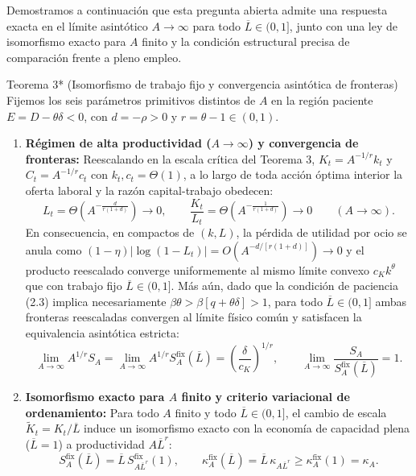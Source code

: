 \documentclass[11pt,letterpaper]{article}
\theoremstyle{plain}
\newtheorem*{namedthm}{\protect\namedthmname}
\newcommand{\namedthmname}{}
\newenvironment{thm_box}[1]{\renewcommand{\namedthmname}{#1}\begin{namedthm}}{\end{namedthm}}
\begin{document}
Demostramos a continuación que esta pregunta abierta admite una respuesta exacta en el límite asintótico $A\to\infty$ para todo $\overline{L}\in(0,1]$, junto con una ley de isomorfismo exacto para $A$ finito y la condición estructural precisa de comparación frente a pleno empleo.

\begin{thm_box}{Teorema 3* (Isomorfismo de trabajo fijo y convergencia asintótica de fronteras)}
Fijemos los seis parámetros primitivos distintos de $A$ en la región paciente $E=D-\theta\delta<0$, con $d=-\rho>0$ y $r=\theta-1\in(0,1)$.
\begin{enumerate}
\item \textbf{Régimen de alta productividad ($A\to\infty$) y convergencia de fronteras:} Reescalando en la escala crítica del Teorema 3, $K_t = A^{-1/r}k_t$ y $C_t = A^{-1/r}c_t$ con $k_t,c_t=\Theta(1)$, a lo largo de toda acción óptima interior la oferta laboral y la razón capital-trabajo obedecen:
\[
L_t = \Theta\!\left(A^{-\frac{d}{r(1+d)}}\right) \to 0, \qquad \frac{K_t}{L_t} = \Theta\!\left(A^{-\frac{1}{r(1+d)}}\right) \to 0 \qquad (A\to\infty).
\]
En consecuencia, en compactos de $(k,L)$, la pérdida de utilidad por ocio se anula como $(1-\eta)|\log(1-L_t)| = O(A^{-d/[r(1+d)]})\to 0$ y el producto reescalado converge uniformemente al mismo límite convexo $c_K k^\theta$ que con trabajo fijo $\overline{L}\in(0,1]$. Más aún, dado que la condición de paciencia (2.3) implica necesariamente $\beta\theta > \beta[q+\theta\delta] > 1$, para todo $\overline{L}\in(0,1]$ ambas fronteras reescaladas convergen al límite físico común y satisfacen la equivalencia asintótica estricta:
\[
\lim_{A\to\infty} A^{1/r} S_A = \lim_{A\to\infty} A^{1/r} S_A^{\mathrm{fix}}(\overline{L}) = \left(\frac{\delta}{c_K}\right)^{1/r}, \qquad \lim_{A\to\infty} \frac{S_A}{S_A^{\mathrm{fix}}(\overline{L})} = 1.
\]
\item \textbf{Isomorfismo exacto para $A$ finito y criterio variacional de ordenamiento:} Para todo $A$ finito y todo $\overline{L}\in(0,1]$, el cambio de escala $\tilde{K}_t=K_t/\overline{L}$ induce un isomorfismo exacto con la economía de capacidad plena ($\overline{L}=1$) a productividad $A\overline{L}^r$:
\[
S_A^{\mathrm{fix}}(\overline{L}) = \overline{L}\,S_{A\overline{L}^r}^{\mathrm{fix}}(1), \qquad \kappa_A^{\mathrm{fix}}(\overline{L}) = \overline{L}\,\kappa_{A\overline{L}^r} \ge \kappa_A^{\mathrm{fix}}(1) = \kappa_A.
\]

\end{enumerate}
\end{thm_box}
\end{document}
